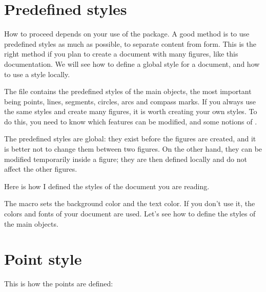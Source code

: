 \section{Predefined styles}\label{custom}
How to proceed depends on your use of the package. A good method is to use predefined styles as much as possible, to separate content from form. This is the right method if you plan to create a document with many figures, like this documentation. We will see how to define a global style for a document, and how to use a style locally.

The file  contains the predefined styles of the main objects, the most important being points, lines, segments, circles, arcs and compass marks.
 If you always use the same styles and create many figures, it is worth creating your own styles. To do this, you need to know which features can be modified, and some notions of \TIKZ.
 
 The predefined styles are global: they exist before the figures are created, and it is better not to change them between two figures. On the other hand, they can be modified temporarily inside a figure; they are then defined locally and do not affect the other figures.
 
 Here is how I defined the styles of the document you are reading.

\begin{tkzltxexample}[]
  \tkzSetUpColors[background=white,text=black]  
  \tkzSetUpPoint[size=2,color=teal]
  \tkzSetUpLine[line width=.4pt,color=teal]
  \tkzSetUpCompass[color=orange, line width=.4pt,delta=10]
  \tkzSetUpArc[color=gray,line width=.4pt]
\end{tkzltxexample}

The macro  sets the background color and the text color. If you don't use it, the colors and fonts of your document are used. Let's see how to define the styles of the main objects.

\section{Point style}
This is how the points are defined:
\begin{tkzltxexample}[]
\end{tkzltxexample}


